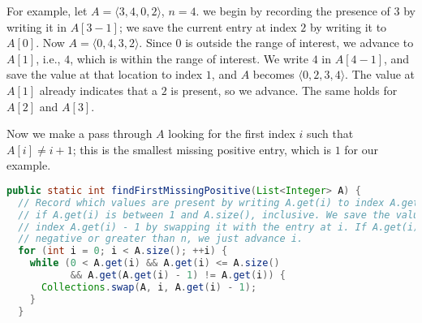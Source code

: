 \documentclass[10pt,openany,twoside,letterpaper,extrafontsizes]{memoir}
\newif\ifCpp
\newif\ifJava
\begin{document}
\begin{Spacing}{\honorsSpacing}
For example, let $A = \langle 3,4,0,2\rangle$, $n=4$.
we begin by recording the presence of $3$ by writing it in $A[3-1]$; we save the
current entry at index $2$ by writing it to $A[0]$. Now $A = \langle 0,4,3,2\rangle$.
Since $0$ is outside the range of interest, we advance to $A[1]$, i.e., $4$, which is
within the range of interest. We write $4$ in $A[4-1]$, and save the value at that location
to index $1$, and $A$ becomes $\langle 0,2,3,4\rangle$. The value at $A[1]$ already
indicates that a $2$ is present, so we advance. The same holds for $A[2]$ and $A[3]$.

Now we make a pass through $A$ looking for the first index $i$ such that $A[i] \not= i+1$;
this is the smallest missing positive entry, which is $1$ for our example.


\ifCpp
\begin{lstlisting}[language={[11]C++}]
// A is passed by value argument, since we change it.
int FindFirstMissingPositive(vector<int> A) {
  // Record which values are present by writing A[i] to index A[i] - 1 if A[i]
  // is between 1 and A.size(), inclusive. We save the value at index
  // A[i] - 1 by swapping it with the entry at i. If A[i] is negative or
  // greater than n, we just advance i.
  for (int i = 0; i < A.size(); ++i) {
    while (0 < A[i] && A[i] <= A.size() && A[i] != A[A[i] - 1]) {
      swap(A[i], A[A[i] - 1]);
    }
  }

  // Second pass through A to search for the first index i such that
  // A[i] != i+1, indicating that i + 1 is absent. If all numbers between 1
  // and A.size() are present, the smallest missing positive is A.size() + 1.
  for (int i = 0; i < A.size(); ++i) {
    if (A[i] != i + 1) {
      return i + 1;
    }
  }
  return A.size() + 1;
}
\end{lstlisting}
\fi%
\ifJava
\begin{lstlisting}[language=Java]
public static int findFirstMissingPositive(List<Integer> A) {
  // Record which values are present by writing A.get(i) to index A.get(i) - 1
  // if A.get(i) is between 1 and A.size(), inclusive. We save the value at
  // index A.get(i) - 1 by swapping it with the entry at i. If A.get(i) is
  // negative or greater than n, we just advance i.
  for (int i = 0; i < A.size(); ++i) {
    while (0 < A.get(i) && A.get(i) <= A.size()
           && A.get(A.get(i) - 1) != A.get(i)) {
      Collections.swap(A, i, A.get(i) - 1);
    }
  }


\end{lstlisting}
\end{Spacing}
\end{document}
